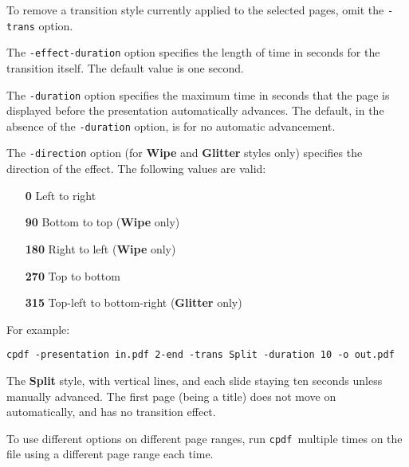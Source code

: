\documentclass{book}
\newcommand{\cpdf}{\texttt{cpdf}}
\begin{document}
\noindent To remove a transition style currently applied to the selected pages,
omit the \texttt{-trans} option.

The \texttt{-effect-duration} option specifies the length of time in seconds
for the transition itself. The default value is one second.

The \texttt{-duration} option specifies the maximum time in seconds that the
page is displayed before the presentation automatically advances. The default,
in the absence of the \texttt{-duration} option, is for no automatic
advancement.

The \texttt{-direction} option (for \textbf{Wipe} and \textbf{Glitter} styles
only) specifies the direction of the effect. The following values are valid:
\begin{itemize}
  \item[\textbf{0}] Left to right
  \item[\textbf{90}] Bottom to top (\textbf{Wipe} only)
  \item[\textbf{180}] Right to left (\textbf{Wipe} only)
  \item[\textbf{270}] Top to bottom
  \item[\textbf{315}] Top-left to bottom-right (\textbf{Glitter} only)
\end{itemize}

\noindent For example:
\begin{framed}
  \small
  \noindent\verb!cpdf -presentation in.pdf 2-end -trans Split -duration 10 -o out.pdf!

  \vspace{2.5mm}
  The \textbf{Split} style, with vertical lines, and each slide staying ten
seconds unless manually advanced. The first page (being a title) does not move
on automatically, and has no transition effect.

\end{framed}

\noindent To use different options on different page ranges, run \cpdf\ multiple times on
the file using a different page range each time.
\end{document}
